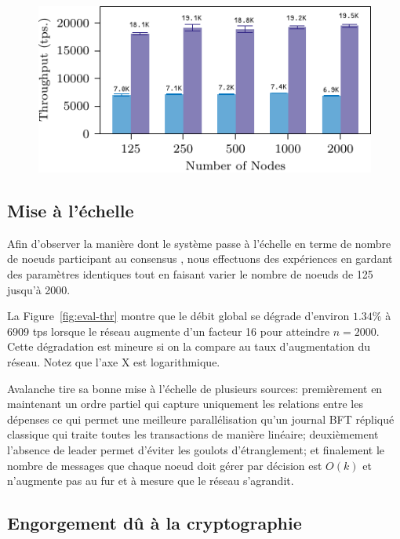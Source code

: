 \begin{figure}
\includegraphics[width=\linewidth]{figures/thr-raw.pdf}
\label{fig:eval-thr-raw}
\end{figure}

\subsection{Mise à l'échelle}

Afin d'observer la manière dont le système passe à l'échelle en terme de nombre de noeuds participant au consensus
{\sysname}, nous effectuons des expériences en gardant des paramètres identiques tout en faisant varier le
nombre de noeuds de 125 jusqu'à 2000.

La Figure~\ref{fig:eval-thr} montre que le débit global se dégrade d'environ $1.34\%$ à 6909 tps lorsque le
réseau augmente d'un facteur 16 pour atteindre $n = 2000$. Cette dégradation est mineure si on la compare au
taux d'augmentation du réseau. Notez que l'axe X est logarithmique.

Avalanche tire sa bonne mise à l'échelle de plusieurs sources: premièrement en maintenant un ordre partiel qui
capture uniquement les relations entre les dépenses ce qui permet une meilleure parallélisation qu'un journal
BFT répliqué classique qui traite toutes les transactions de manière linéaire; deuxièmement l'absence de leader
permet d'éviter les goulots d'étranglement; et finalement le nombre de messages que chaque noeud doit gérer par
décision est $O(k)$ et n'augmente pas au fur et à mesure que le réseau s'agrandit.

\subsection{Engorgement dû à la cryptographie}

